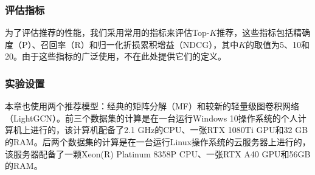 \subsubsection{评估指标}
为了评估推荐的性能，我们采用常用的指标来评估Top-$K$推荐，这些指标包括精确度（P）、召回率（R）和归一化折损累积增益（NDCG），其中$K$的取值为5、10和20。由于这些指标的广泛使用，不在此处提供它们的定义。
\subsubsection{实验设置}
本章也使用两个推荐模型：经典的矩阵分解（MF）\cite{Koren:2009:Computer}和较新的轻量级图卷积网络（LightGCN）\cite{Xiangnan:2020:SIGIR}。前三个数据集的计算是在一台运行Windows 10操作系统的个人计算机上进行的，该计算机配备了2.1 GHz的CPU、一张RTX 1080Ti GPU和32 GB的RAM。后两个数据集的计算是在一台运行Linux操作系统的云服务器上进行的，该服务器配备了一颗Xeon(R) Platinum 8358P CPU、一张RTX A40 GPU和56GB的RAM。
